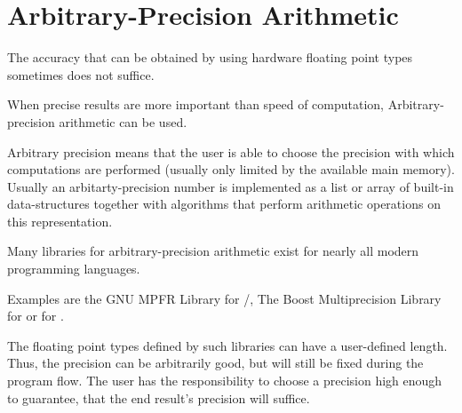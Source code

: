 \section{Arbitrary-Precision Arithmetic}
	The accuracy that can be obtained by using hardware floating point types
  sometimes does not suffice.
	
	When precise results are more important than speed of computation, Arbitrary-precision arithmetic can be used.

	Arbitrary precision means that the user is able to choose the precision with which 
	computations are performed (usually only limited by the available main memory).
  Usually an arbitarty-precision number is implemented as a list or array of
  built-in data-structures together with algorithms that perform arithmetic operations on
  this representation.

	Many libraries for arbitrary-precision arithmetic exist for nearly all modern
  programming languages.
  
	Examples are the GNU MPFR Library for /\cc, The Boost Multiprecision Library for \cc or  for . 
  
  The floating point types defined by such libraries can have a user-defined
  length. 
  Thus, the precision can be arbitrarily good, but will still be fixed during
  the program flow.
  The user has the responsibility to choose a precision high enough to
  guarantee, that the end result's precision will suffice.

